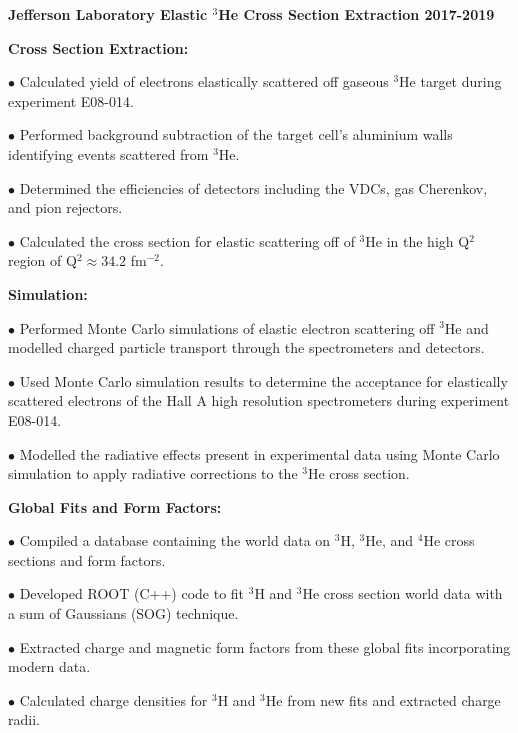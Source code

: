 \documentclass[letterpaper,10pt]{article}
\renewenvironment{itemize}{
  \begin{list}{}{
    \setlength{\leftmargin}{1.5em}
  }
}{
  \end{list}
}
\begin{document}
{\begin{itemize}
\item {\large {\bf Jefferson Laboratory Elastic $^{3}$He Cross Section Extraction 2017-2019} }
	\begin{itemize}\itemsep5pt \parskip0pt 
		\item \textbf{Cross Section Extraction:}
			\begin{itemize}\itemsep5pt
				\item $\bullet$ Calculated yield of electrons elastically scattered off gaseous $^{3}$He target during experiment E08-014.   
				\item $\bullet$ Performed background subtraction of the target cell's aluminium walls identifying events scattered from $^{3}$He.
				\item $\bullet$ Determined the efficiencies of detectors including the VDCs, gas Cherenkov, and pion rejectors.
				\item $\bullet$ Calculated the cross section for elastic scattering off of $^{3}$He in the high Q$^2$ region of Q$^2 \approx 34.2$ fm$^{-2}$.
			\end{itemize}
		\item \textbf{Simulation:}
			\begin{itemize}\itemsep5pt
				\item $\bullet$ Performed Monte Carlo simulations of elastic electron scattering off $^{3}$He and modelled charged particle transport through the spectrometers and detectors. %
				\item $\bullet$ Used Monte Carlo simulation results to determine the acceptance for elastically scattered electrons of the Hall A high resolution spectrometers during experiment E08-014. 
				\item $\bullet$ Modelled the radiative effects present in experimental data using Monte Carlo simulation to apply radiative corrections to the $^{3}$He cross section.
			\end{itemize}
		\item \textbf{Global Fits and Form Factors:}
			\begin{itemize}\itemsep5pt
				\item $\bullet$ Compiled a database containing the world data on $^{3}$H, $^{3}$He, and $^{4}$He cross sections and form factors.
				\item $\bullet$ Developed ROOT (C++) code to fit $^{3}$H and $^{3}$He cross section world data with a sum of Gaussians (SOG) technique. 
				\item $\bullet$ Extracted charge and magnetic form factors from these global fits incorporating modern data. 
				\item $\bullet$ Calculated charge densities for $^{3}$H and $^{3}$He from new fits and extracted charge radii. 
			\end{itemize}
			

\end{itemize}
\end{itemize}}
\end{document}
